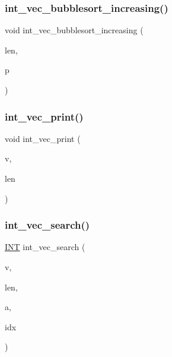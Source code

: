 \subsubsection{\texorpdfstring{int\+\_\+vec\+\_\+bubblesort\+\_\+increasing()}{int\_vec\_bubblesort\_increasing()}}
{\footnotesize\ttfamily void int\+\_\+vec\+\_\+bubblesort\+\_\+increasing (\begin{DoxyParamCaption}\item[{\mbox{\hyperlink{galois_8h_a09fddde158a3a20bd2dcadb609de11dc}{I\+NT}}}]{len,  }\item[{\mbox{\hyperlink{galois_8h_a09fddde158a3a20bd2dcadb609de11dc}{I\+NT}} $\ast$}]{p }\end{DoxyParamCaption})}

\mbox{\label{inc__gen__global_8_c_adcaeaef80b0ea0170dd00ded275e80bc}} 
\subsubsection{\texorpdfstring{int\+\_\+vec\+\_\+print()}{int\_vec\_print()}}
{\footnotesize\ttfamily void int\+\_\+vec\+\_\+print (\begin{DoxyParamCaption}\item[{\mbox{\hyperlink{galois_8h_a09fddde158a3a20bd2dcadb609de11dc}{I\+NT}} $\ast$}]{v,  }\item[{\mbox{\hyperlink{galois_8h_a09fddde158a3a20bd2dcadb609de11dc}{I\+NT}}}]{len }\end{DoxyParamCaption})}

\mbox{\label{inc__gen__global_8_c_a016819bbe2e28480071786ea3a844689}} 
\subsubsection{\texorpdfstring{int\+\_\+vec\+\_\+search()}{int\_vec\_search()}}
{\footnotesize\ttfamily \mbox{\hyperlink{galois_8h_a09fddde158a3a20bd2dcadb609de11dc}{I\+NT}} int\+\_\+vec\+\_\+search (\begin{DoxyParamCaption}\item[{\mbox{\hyperlink{galois_8h_a09fddde158a3a20bd2dcadb609de11dc}{I\+NT}} $\ast$}]{v,  }\item[{\mbox{\hyperlink{galois_8h_a09fddde158a3a20bd2dcadb609de11dc}{I\+NT}}}]{len,  }\item[{\mbox{\hyperlink{galois_8h_a09fddde158a3a20bd2dcadb609de11dc}{I\+NT}}}]{a,  }\item[{\mbox{\hyperlink{galois_8h_a09fddde158a3a20bd2dcadb609de11dc}{I\+NT}} \&}]{idx }\end{DoxyParamCaption})}

